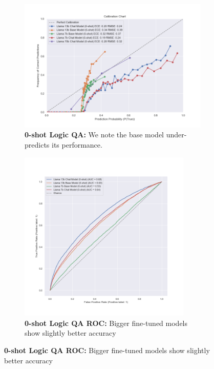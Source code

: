 \documentclass[11pt]{article}
\begin{document}
\begin{figure}
     \centering
     \begin{subfigure}[b]{0.60\textwidth}
         \centering \includegraphics[width=1.0\textwidth]{figures/0-shot-logic-qa.png}
         \caption{\textbf{0-shot Logic QA:} We note the base model under-predicts its performance.} 
         \label{fig:0-shot-logic-qa}
     \end{subfigure}
     \hfill
     \begin{subfigure}[b]{0.38\textwidth}
         \centering \includegraphics[width=0.9\textwidth]{figures/0-shot-logic-qa-roc.png}
         \caption{\textbf{0-shot Logic QA ROC:} Bigger fine-tuned models show slightly better accuracy}
         \label{fig:0-shot-logic-qa-roc}
    \end{subfigure}  
    

\end{figure}
\end{document}
